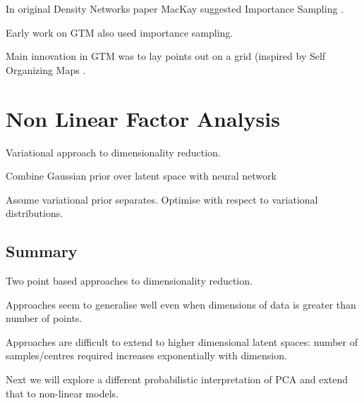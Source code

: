 In original Density Networks paper MacKay suggested Importance Sampling
  \cite{MacKay:wondsa95}.

Early work on GTM also used importance sampling.

Main innovation in GTM was to lay points out on a grid (inspired by
  Self Organizing Maps \cite{Kohonen:book01}.

\section{Non Linear Factor Analysis}

Variational approach to dimensionality reduction.

Combine Gaussian prior over latent space with neural network \cite{Honkela:unsupervised04}

Assume variational prior separates.
Optimise with respect to variational distributions.

\subsection{Summary}

Two point based approaches to dimensionality reduction.

Approaches seem to generalise well even when dimensions of data is
  greater than number of points.

Approaches are difficult to extend to higher dimensional latent
  spaces: number of samples/centres required increases exponentially with dimension.

Next we will explore a different probabilistic interpretation of PCA
  and extend that to non-linear models.

